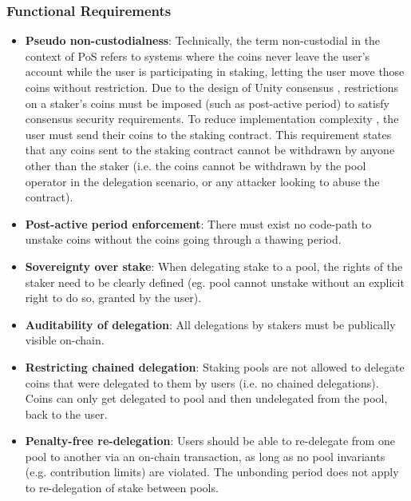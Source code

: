 \subsubsection{Functional Requirements}
\begin{itemize}
    \item \textbf{Pseudo non-custodialness}: Technically, the term non-custodial in the context of PoS refers to systems where the coins never leave the user's account while the user is participating in staking, letting the user move those coins without restriction. Due to the design of Unity consensus \cite{WZS19}, restrictions on a staker's coins must be imposed (such as post-active period) to satisfy consensus security requirements. To reduce implementation complexity \cite{ZZW19}, the user must send their coins to the staking contract. This requirement states that any coins sent to the staking contract cannot be withdrawn by anyone other than the staker (i.e. the coins cannot be withdrawn by the pool operator in the delegation scenario, or any attacker looking to abuse the contract).
    \item \textbf{Post-active period enforcement}: There must exist no code-path to unstake coins without the coins going through a thawing period. 
    \item \textbf{Sovereignty over stake}: When delegating stake to a pool, the rights of the staker need to be clearly defined (eg. pool cannot unstake without an explicit right to do so, granted by the user).  
    \item \textbf{Auditability of delegation}: All delegations by stakers must be publically visible on-chain. 
    \item \textbf{Restricting chained delegation}: Staking pools are not allowed to delegate coins that were delegated to them by users (i.e. no chained delegations). Coins can only get delegated to pool and then undelegated from the pool, back to the user.  
    \item \textbf{Penalty-free re-delegation}: Users should be able to re-delegate from one pool to another via an on-chain transaction, as long as no pool invariants (e.g. contribution limits) are violated. The unbonding period does not apply to re-delegation of stake between pools. 
\end{itemize}

